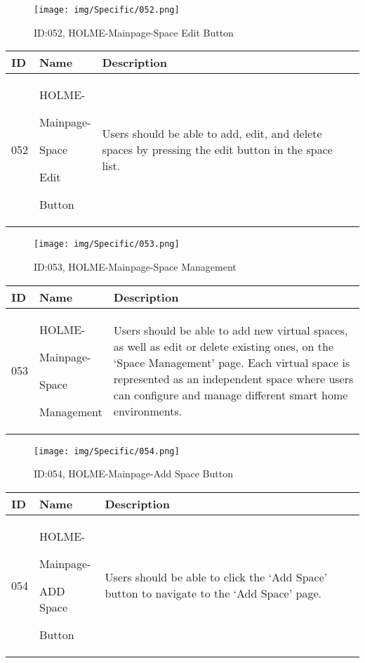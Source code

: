 \documentclass[conference]{IEEEtran}
\begin{document}
\begin{enumerate}
\begin{figure}[h]
\centering
\texttt{[image: img/Specific/052.png]}
\caption{ID:052, HOLME-Mainpage-Space Edit Button}
\end{figure}
\begin{table}[h]
\def\arraystretch{1.2} \small
    \begin{tabular}{|p{1cm}|p{1.8cm}|p{5.0cm}|}
        \hline
        ID & Name & Description\\ \hline
         052 \par  & HOLME-\par Mainpage-\par Space \par Edit \par Button &Users should be able to add, edit, and delete spaces by pressing the edit button in the space list.\\ \hline
    \end{tabular}
\end{table}

\begin{figure}[h]
\centering
\texttt{[image: img/Specific/053.png]}
\caption{ID:053, HOLME-Mainpage-Space Management}
\end{figure}
\begin{table}[h]
\def\arraystretch{1.2} \small
    \begin{tabular}{|p{1cm}|p{1.8cm}|p{5.0cm}|}
        \hline
        ID & Name & Description\\ \hline
         053 \par  & HOLME-\par Mainpage-\par Space \par Management &Users should be able to add new virtual spaces, as well as edit or delete existing ones, on the `Space Management' page. Each virtual space is represented as an independent space where users can configure and manage different smart home environments.\\ \hline
    \end{tabular}
\end{table}
\clearpage

\begin{figure}[h]
\centering
\texttt{[image: img/Specific/054.png]}
\caption{ID:054, HOLME-Mainpage-Add Space Button }
\end{figure}
\begin{table}[h]
\def\arraystretch{1.2} \small
    \begin{tabular}{|p{1cm}|p{1.8cm}|p{5.0cm}|}
        \hline
        ID & Name & Description\\ \hline
         054 \par  & HOLME-\par Mainpage-\par ADD Space \par Button &Users should be able to click the `Add Space' button to navigate to the `Add Space' page.\\ \hline
    \end{tabular}
\end{table}


\end{enumerate}
\end{document}

